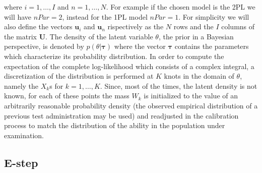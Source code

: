 where $i=1,\ldots,I$ and $n=1,\ldots,N$. For example if the chosen model is the 2PL we will have $nPar=2$, instead for the 1PL model $nPar=1$.
For simplicity we will also define the vectors $\mathbf{u}_i$ and $\mathbf{u}_n$ rispectively as the $N$ rows and the $I$ columns of the matrix $\mathbf{U}$. 
The density of the latent variable $\theta$, the prior in a Bayesian perspective, is denoted by $p(\theta|\boldsymbol{\tau})$ where the vector $\boldsymbol{\tau}$ contains the parameters which characterize its probability distribution. In order to compute the expectation of the complete log-likelihood which consists of a complex integral, a discretization of the distribution is performed at $K$ knots in the domain of $\theta$, namely the $X_k$s for $k=1,\ldots,K$. Since, most of the times, the latent density is not known, for each of these points the mass $W_k$ is initialized to the value of an arbitrarily reasonable probability density (the observed empirical distribution of a previous test administration may be used) and readjusted in the calibration process to match the distribution of the ability in the population under examination.

\subsection{E-step} 

